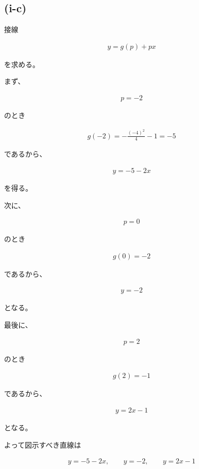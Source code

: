\documentclass[platex,dvipdfmx,a4paper]{jsarticle}
\begin{document}
\subsection{(i-c)}

接線

\begin{align*}
y=g(p)+px
\end{align*}

を求める。

まず、

\begin{align*}
p=-2
\end{align*}

のとき

\begin{align*}
g(-2)
=
-\frac{(-4)^2}{4}-1
=
-5
\end{align*}

であるから、

\begin{align*}
y=-5-2x
\end{align*}

を得る。

次に、

\begin{align*}
p=0
\end{align*}

のとき

\begin{align*}
g(0)
=-2
\end{align*}

であるから、

\begin{align*}
y=-2
\end{align*}

となる。

最後に、

\begin{align*}
p=2
\end{align*}

のとき

\begin{align*}
g(2)
=-1
\end{align*}

であるから、

\begin{align*}
y=2x-1
\end{align*}

となる。

よって図示すべき直線は

\begin{align*}
y=-5-2x,
\qquad
y=-2,
\qquad
y=2x-1
\end{align*}
\end{document}
